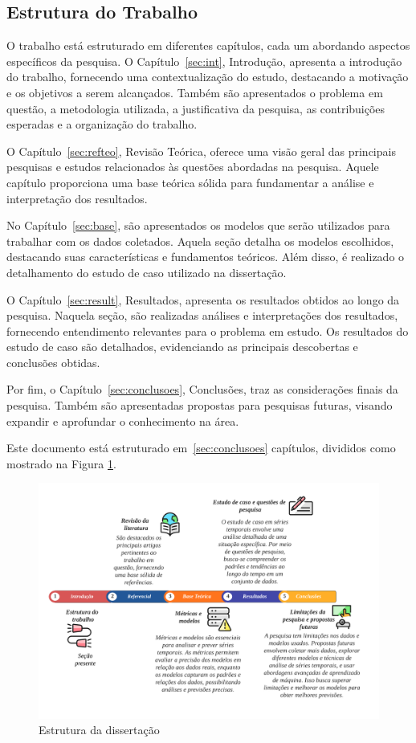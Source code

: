 \subsection{Estrutura do Trabalho} \label{subsec:estrutura}


O trabalho está estruturado em diferentes capítulos, cada um abordando aspectos específicos da pesquisa. 
O Capítulo~\ref{sec:int}, Introdução, apresenta a introdução do trabalho, fornecendo uma contextualização do estudo, destacando a motivação e os objetivos a serem alcançados. Também são apresentados o problema em questão, a metodologia utilizada, a justificativa da pesquisa, as contribuições esperadas e a organização do trabalho.

O Capítulo~\ref{sec:refteo}, Revisão Teórica, oferece uma visão geral das principais pesquisas e estudos relacionados às questões abordadas na pesquisa. Aquele capítulo proporciona uma base teórica sólida para fundamentar a análise e interpretação dos resultados.

No Capítulo~\ref{sec:base}, são apresentados os modelos que serão utilizados para trabalhar com os dados coletados. Aquela seção detalha os modelos escolhidos, destacando suas características e fundamentos teóricos. Além disso, é realizado o detalhamento do estudo de caso utilizado na dissertação.


O Capítulo~\ref{sec:result}, Resultados, apresenta os resultados obtidos ao longo da pesquisa. Naquela seção, são realizadas análises e interpretações dos resultados, fornecendo entendimento relevantes para o problema em estudo. Os resultados do estudo de caso são detalhados, evidenciando as principais descobertas e conclusões obtidas.

Por fim, o Capítulo~\ref{sec:conclusoes}, Conclusões, traz as considerações finais da pesquisa. Também são apresentadas propostas para pesquisas futuras, visando expandir e aprofundar o conhecimento na área.

Este documento está estruturado em~\ref{sec:conclusoes} capítulos, divididos como mostrado na Figura \ref{fig:estrutura}.
 
 \begin{figure}[H]
 	\centering
 	\caption{Estrutura da dissertação}
 	\label{fig:estrutura}
 	\includegraphics[width=\linewidth]{Introducao/Figuras/Estrutura}
 	
 \end{figure}




